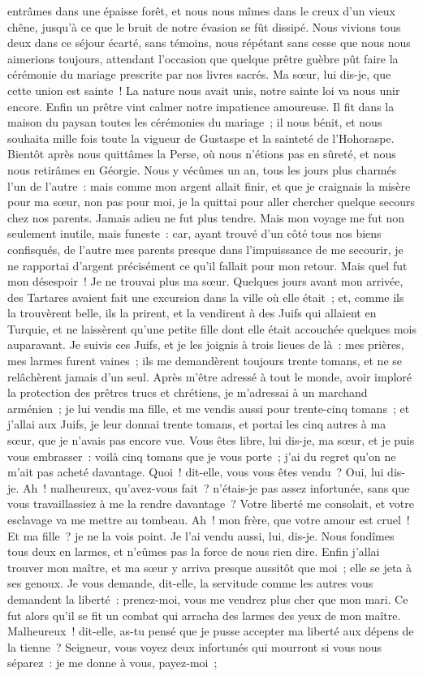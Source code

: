 \documentclass[french,twoside]{book} %
\begin{document}
entrâmes dans une épaisse forêt, et nous nous mîmes dans le creux d’un vieux chêne, jusqu’à ce que le bruit de notre évasion se fût dissipé. Nous vivions tous deux dans ce séjour écarté, sans témoins, nous répétant sans cesse que nous nous aimerions toujours, attendant l’occasion que quelque prêtre guèbre pût faire la cérémonie du mariage prescrite par nos livres sacrés. Ma sœur, lui dis-je, que cette union est sainte ! La nature nous avait unis, notre sainte loi va nous unir encore. Enfin un prêtre vint calmer notre impatience amoureuse. Il fit dans la maison du paysan toutes les cérémonies du mariage ; il nous bénit, et nous souhaita mille fois toute la vigueur de Gustaspe et la sainteté de l’Hohoraspe. Bientôt après nous quittâmes la Perse, où nous n’étions pas en sûreté, et nous nous retirâmes en Géorgie. Nous y vécûmes un an, tous les jours plus charmés l’un de l’autre : mais comme mon argent allait finir, et que je craignais la misère pour ma sœur, non pas pour moi, je la quittai pour aller chercher quelque secours chez nos parents. Jamais adieu ne fut plus tendre. Mais mon voyage me fut non seulement inutile, mais funeste : car, ayant trouvé d’un côté tous nos biens confisqués, de l’autre mes parents presque dans l’impuissance de me secourir, je ne rapportai d’argent précisément ce qu’il fallait pour mon retour. Mais quel fut mon désespoir ! Je ne trouvai plus ma sœur. Quelques jours avant mon arrivée, des Tartares avaient fait une excursion dans la ville où elle était ; et, comme ils la trouvèrent belle, ils la prirent, et la vendirent à des Juifs qui allaient en Turquie, et ne laissèrent qu’une petite fille dont elle était accouchée quelques mois auparavant. Je suivis ces Juifs, et je les joignis à trois lieues de là : mes prières, mes larmes furent vaines ; ils me demandèrent toujours trente tomans, et ne se relâchèrent jamais d’un seul. Après m’être adressé à tout le monde, avoir imploré la protection des prêtres trucs et chrétiens, je m’adressai à un marchand arménien ; je lui vendis ma fille, et me vendis aussi pour trente-cinq tomans ; et j’allai aux Juifs, je leur donnai trente tomans, et portai les cinq autres à ma sœur, que je n’avais pas encore vue. Vous êtes libre, lui dis-je, ma sœur, et je puis vous embrasser : voilà cinq tomans que je vous porte ; j’ai du regret qu’on ne m’ait pas acheté davantage. Quoi ! dit-elle, vous vous êtes vendu ? Oui, lui dis-je. Ah ! malheureux, qu’avez-vous fait ? n’étais-je pas assez infortunée, sans que vous travaillassiez à me la rendre davantage ? Votre liberté me consolait, et votre esclavage va me mettre au tombeau. Ah ! mon frère, que votre amour est cruel ! Et ma fille ? je ne la vois point. Je l’ai vendu aussi, lui, dis-je. Nous fondîmes tous deux en larmes, et n’eûmes pas la force de nous rien dire. Enfin j’allai trouver mon maître, et ma sœur y arriva presque aussitôt que moi ; elle se jeta à ses genoux. Je vous demande, dit-elle, la servitude comme les autres vous demandent la liberté : prenez-moi, vous me vendrez plus cher que mon mari. Ce fut alors qu’il se fit un combat qui arracha des larmes des yeux de mon maître. Malheureux ! dit-elle, as-tu pensé que je pusse accepter ma liberté aux dépens de la tienne ? Seigneur, vous voyez deux infortunés qui mourront si vous nous séparez : je me donne à vous, payez-moi ; 
\end{document}
